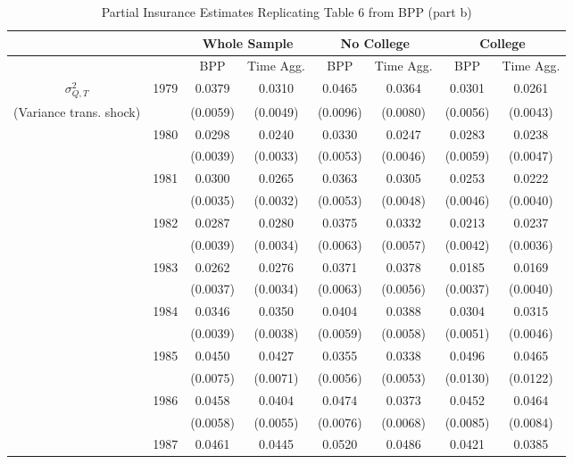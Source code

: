 \begin{table}  
\caption{Partial Insurance Estimates Replicating Table 6 from BPP (part b)}  
\label{table:ReplicationTable6b}  
\begin{center}  
	\tiny
\begin{tabular}{cccc|cc|cc}  
\toprule  
& &  \multicolumn{2}{c}{Whole Sample} &  \multicolumn{2}{c}{No College} &  \multicolumn{2}{c}{College}  
\\ \hline  
& & BPP & Time Agg.  & BPP & Time Agg. & BPP & Time Agg. 
\\ \hline  
 $\sigma^2_{Q,T}$ & 1979      & 0.0379 &   0.0310 & 0.0465 &   0.0364 & 0.0301 &   0.0261 
\\ (Variance trans. shock) &     & (0.0059) & (0.0049) & (0.0096) & (0.0080) & (0.0056) & (0.0043) 
\\  & 1980 & 0.0298 &   0.0240 & 0.0330 &   0.0247 & 0.0283 &   0.0238
\\  &                    & (0.0039) & (0.0033)  & (0.0053) & (0.0046)  & (0.0059) & (0.0047) 
\\  & 1981 & 0.0300 &   0.0265 & 0.0363 &   0.0305 & 0.0253 &   0.0222
\\  &                    & (0.0035) & (0.0032)  & (0.0053) & (0.0048)  & (0.0046) & (0.0040) 
\\  & 1982 & 0.0287 &   0.0280 & 0.0375 &   0.0332 & 0.0213 &   0.0237
\\  &                    & (0.0039) & (0.0034)  & (0.0063) & (0.0057)  & (0.0042) & (0.0036) 
\\  & 1983 & 0.0262 &   0.0276 & 0.0371 &   0.0378 & 0.0185 &   0.0169
\\  &                    & (0.0037) & (0.0034)  & (0.0063) & (0.0056)  & (0.0037) & (0.0040) 
\\  & 1984 & 0.0346 &   0.0350 & 0.0404 &   0.0388 & 0.0304 &   0.0315
\\  &                    & (0.0039) & (0.0038)  & (0.0059) & (0.0058)  & (0.0051) & (0.0046) 
\\  & 1985 & 0.0450 &   0.0427 & 0.0355 &   0.0338 & 0.0496 &   0.0465
\\  &                    & (0.0075) & (0.0071)  & (0.0056) & (0.0053)  & (0.0130) & (0.0122) 
\\  & 1986 & 0.0458 &   0.0404 & 0.0474 &   0.0373 & 0.0452 &   0.0464
\\  &                    & (0.0058) & (0.0055)  & (0.0076) & (0.0068)  & (0.0085) & (0.0084) 
\\  & 1987 & 0.0461 &   0.0445 & 0.0520 &   0.0486 & 0.0421 &   0.0385

\end{tabular}
\end{center}
\end{table}
